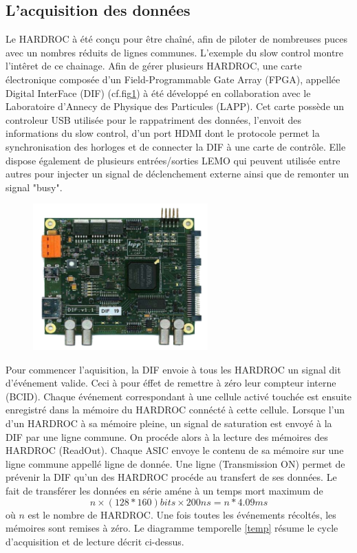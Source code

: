 \subsection{L'acquisition des données}
Le HARDROC à été conçu pour être chaîné, afin de piloter de nombreuses puces avec un nombres réduits de lignes communes. L'exemple du slow control montre l'intêret de ce chainage. Afin de gérer plusieurs HARDROC, une carte électronique composée d'un Field-Programmable Gate Array (FPGA), appellée Digital InterFace (DIF) (cf.fig\ref{DIF}) à été développé en collaboration avec le Laboratoire d'Annecy de Physique des Particules (LAPP). Cet carte possède un controleur USB utilisée pour le rappatriment des données, l'envoit des informations du slow control, d'un port HDMI dont le protocole permet la synchronisation des horloges et de connecter la DIF à une carte de contrôle. Elle dispose également de plusieurs entrées/sorties LEMO qui peuvent utilisée entre autres pour injecter un signal de déclenchement externe ainsi que de remonter un signal "busy".

\begin{figure}[ht!]
	\centering
	\includegraphics[width=0.6\textwidth]{GLA/DIF.png}
	\label{DIF}
\end{figure}

Pour commencer l'aquisition, la DIF envoie à tous les HARDROC un signal dit d'événement valide. Ceci à pour éffet de remettre à zéro leur compteur interne (BCID). Chaque événement correspondant à une cellule activé touchée est ensuite enregistré dans la mémoire du HARDROC connécté à cette cellule. Lorsque l'un d'un HARDROC à sa mémoire pleine, un signal de saturation est envoyé à la DIF par une ligne commune. On procéde alors à la lecture des mémoires des HARDROC (ReadOut). Chaque ASIC envoye le contenu de sa mémoire sur une ligne commune appellé ligne de donnée. Une ligne (Transmission ON) permet de prévenir la DIF qu'un des HARDROC procéde au transfert de ses données. Le fait de transférer les données en série améne à un temps mort maximum de
\begin{equation}
n\times(128*160)bits\times 200ns= n*4.09ms
\end{equation} 
où $n$ est le nombre de HARDROC. Une fois toutes les événements récoltés, les mémoires sont remises à zéro. Le diagramme temporelle \ref{temp} résume le cycle d'acquisition et de lecture décrit ci-dessus.

